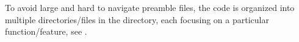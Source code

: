 To avoid large and hard to navigate preamble files, the code is organized into multiple directories/files in the  directory, each focusing on a particular function/feature, see .
%
%
%
